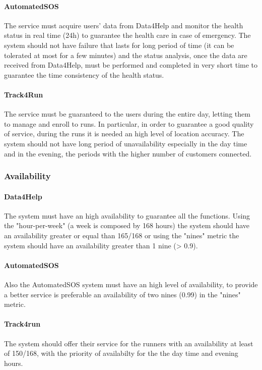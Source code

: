 \documentclass[a4paper]{article}
\begin{document}
    \paragraph{AutomatedSOS} The service must acquire users' data from Data4Help and monitor the health status in real time (24h) to guarantee the health care in case of emergency. The system should not have failure that lasts for long period of time (it can be tolerated at most for a few minutes) and the status analysis, once the data are received from Data4Help, must be performed and completed in very short time to guarantee the time consistency of the health status.
    
    \paragraph{Track4Run} The service must be guaranteed to the users during the entire day, letting them to manage and enroll to runs. In particular, in order to guarantee a good quality of service, during the runs it is needed an high level of location accuracy. The system should not have long period of unavailability especially in the day time and in the evening, the periods with the higher number of customers connected.
    \subsubsection{Availability}
    
    \paragraph{Data4Help} The system must have an high availability to guarantee all the functions. Using the "hour-per-week"  (a week is composed by 168 hours) the system should have an availability greater or equal than 165/168 or using the "nines" metric the system should have an availability greater than 1 nine (> 0.9).
    
    \paragraph{AutomatedSOS} Also the AutomatedSOS system must have an high level of availability, to provide a better service is preferable an availability of two nines (0.99) in the "nines" metric.
    
    \paragraph{Track4run} The system should offer their service for the runners with an availability at least of 150/168, with the priority of availabilty for the the day time and evening hours.
    
\end{document}
